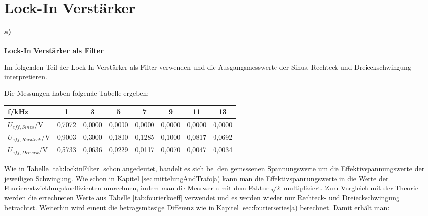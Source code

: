 
\section{Lock-In Verstärker}
\label{sec:lockin}

\paragraph{a)}\textbf{Lock-In Verstärker als Filter}

Im folgenden Teil der Lock-In Verstärker als Filter verwenden und die Ausgangsmesswerte der Sinus, Rechteck und Dreieckschwingung interpretieren.

Die Messungen haben folgende Tabelle ergeben:
\begin{center}
    \begin{tabular}{l | c c c c c c c}
        f/kHz               & 1 & 3 & 5 & 7 & 9 & 11 & 13 \\
        \hline
        $U_{eff,Sinus}$/V     & 0,7072 & 0,0000 & 0,0000 & 0,0000 & 0,0000 & 0,0000 & 0,0000 \\
        $U_{eff,Rechteck}$/V  & 0,9003 & 0,3000 & 0,1800 & 0,1285 & 0,1000 & 0,0817 & 0,0692 \\
        $U_{eff,Dreieck}$/V   & 0,5733 & 0,0636 & 0,0229 & 0,0117 & 0,0070 & 0,0047 & 0,0034 \\
    \end{tabular}
    \label{tab:lockinFilter}
\end{center}
Wie in Tabelle \ref{tab:lockinFilter} schon angedeutet, handelt es sich bei den gemessenen Spannungswerte um die Effektivspannungswerte der jeweiligen Schwingung. Wie schon in Kapitel \ref{sec:mittelungAndTrafo}a) kann man die Effektivspannungswerte in die Werte der Fourierentwicklungskoeffizienten umrechnen, indem man die Messwerte mit dem Faktor $\sqrt{2}$ multipliziert. Zum Vergleich mit der Theorie werden die errechneten Werte aus Tabelle \ref{tab:fourierkoeff} verwendet und es werden wieder nur Rechteck- und Dreieckschwingung betrachtet. Weiterhin wird erneut die betragsmässige Differenz wie in Kapitel \ref{sec:fourierseries}a) berechnet. Damit erhält man:
